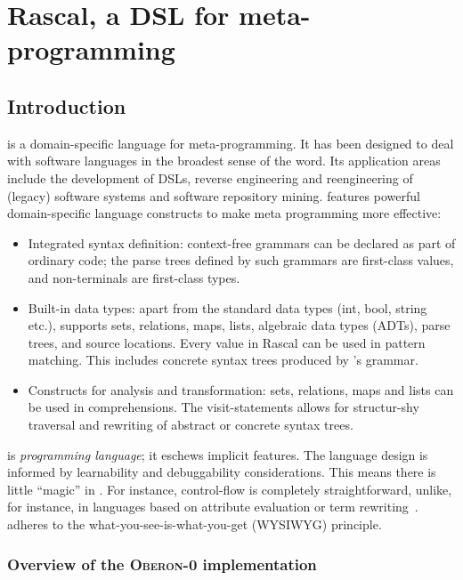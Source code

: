 \section{Rascal, a DSL for meta-programming}

\def\oberon{\textsc{Oberon-0}\xspace}

\def\rcode#1{\texttt{#1}}

\subsection{Introduction}

\noindent \Rascal is a domain-specific language for
meta-programming. It has been designed to deal with software languages
in the broadest sense of the word. Its application areas include the
development of DSLs, reverse engineering and reengineering of (legacy)
software systems and software repository mining. \Rascal features
powerful domain-specific language constructs to make meta programming
more effective:
\begin{itemize}
\item Integrated syntax definition: context-free grammars can be
  declared as part of ordinary \Rascal code; the parse trees defined
  by such grammars are first-class values, and non-terminals are
  first-class types.
\item Built-in data types: apart from the standard data types (int,
  bool, string etc.), \Rascal supports sets, relations, maps, lists,
  algebraic data types (ADTs), parse trees, and source
  locations. Every value in Rascal can be used in pattern
  matching. This includes concrete syntax trees produced by \Rascal's
  grammar.
\item Constructs for analysis and transformation: sets, relations,
  maps and lists can be used in comprehensions. The visit-statements
  allows for structur-shy traversal and rewriting of abstract or
  concrete syntax trees.
\end{itemize}
\Rascal is \textit{programming language}; it eschews implicit
features. The language design is informed by learnability and
debuggability considerations. This means there is little ``magic'' in
\Rascal. For instance, control-flow is completely straightforward,
unlike, for instance, in languages based on attribute evaluation or
term rewriting~\cite{...}. \Rascal adheres to the
what-you-see-is-what-you-get (WYSIWYG) principle.

\subsubsection{Overview of the \Rascal \oberon implementation}

